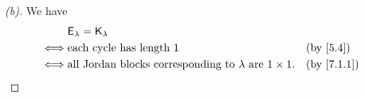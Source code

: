 \begin{proof}[(b)]
  We have
  \begin{align*}
         & \vs{E}_{\lambda} = \vs{K}_{\lambda}                                                         \\
    \iff & \text{each cycle has length } 1                                             &  & \by{5.4}   \\
    \iff & \text{all Jordan blocks corresponding to } \lambda \text{ are } 1 \times 1. &  & \by{7.1.1}
  \end{align*}
\end{proof}

\begin{ex}\label{ex:7.2.20}
\end{ex}

\begin{ex}\label{ex:7.2.21}
\end{ex}
